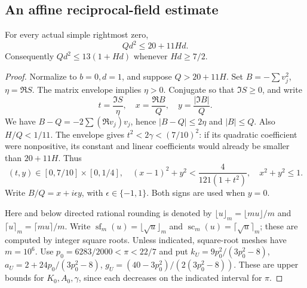 \subsection{An affine reciprocal-field estimate}

\begin{proposition}\label{mf:affine}
For every actual simple rightmost zero,
\begin{equation}\label{mf:affine-bound}
 Qd^2\le20+11Hd.
\end{equation}
Consequently $Qd^2\le13(1+Hd)$ whenever $Hd\ge7/2$.
\end{proposition}

\begin{proof}
Normalize to $b=0,d=1$, and suppose $Q>20+11H$.
Set $B=-\sum v_j^2$, $\eta=\Re S$.
The matrix envelope implies $\eta>0$. Conjugate so that
$\Im S\ge0$, and write
\[
 t=\frac{\Im S}{\eta},\quad
 x=\frac{\Re B}{Q},\quad y=\frac{|\Im B|}{Q}.
\]
We have $B-Q=-2\sum(\Re v_j)v_j$, hence
$|B-Q|\le2\eta$ and $|B|\le Q$. Also
$H/Q<1/11$. The envelope gives
$t^2<2\gamma<(7/10)^2$: if its quadratic coefficient were
nonpositive, its constant and linear coefficients would already
be smaller than $20+11H$. Thus
\begin{equation}\label{mf:affine-domain}
 (t,y)\in[0,7/10]\times[0,1/4],\quad
 (x-1)^2+y^2<\frac4{121(1+t^2)},\quad x^2+y^2\le1.
\end{equation}
Write $B/Q=x+i\epsilon y$, with $\epsilon\in\{-1,1\}$.
Both signs are used when $y=0$.

Here and below directed rational rounding is denoted by
$\lfloor u\rfloor_m=\lfloor mu\rfloor/m$ and
$\lceil u\rceil_m=\lceil mu\rceil/m$. Write
$\operatorname{sf}_m(u)=\lfloor\sqrt u\rfloor_m$ and
$\operatorname{sc}_m(u)=\lceil\sqrt u\rceil_m$; these are computed
by integer square roots. Unless indicated, square-root meshes
have $m=10^6$. Use $p_0=6283/2000<\pi<22/7$ and put
$k_U=9p_0^2/(3p_0^2-8)$,
$a_U=2+24p_0/(3p_0^2-8)$,
$g_U=(40-3p_0^2)/(2(3p_0^2-8))$.
These are upper bounds for $K_0,A_0,\gamma$, since each decreases
on the indicated interval for $\pi$.


\end{proof}
